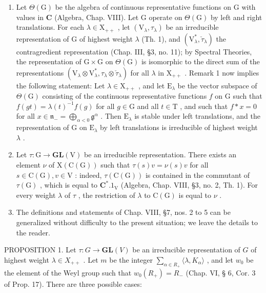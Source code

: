 \begin{enumerate}
\def\labelenumi{\arabic{enumi})}
\setcounter{enumi}{1}
\item
  Let \(\Theta(\mathrm{G})\) be the algebra of continuous representative functions on \(\mathrm{G}\) with values in \(\mathbf{C}\) (Algebra, Chap. VIII). Let \(\mathrm{G}\) operate on \(\Theta(\mathrm{G})\) by left and right translations. For each \(\lambda \in \mathrm{X}_{++}\) , let \((\mathrm{V}_{\lambda}, \tau_{\lambda})\) be an irreducible representation of \(\mathrm{G}\) of highest weight \(\lambda\) (Th. 1), and \((\mathrm{V}_{\lambda}^{*}, \check{\tau}_{\lambda})\) the contragredient representation (Chap. III, §3, no. 11); by Spectral Theories, the representation of \(\mathrm{G} \times \mathrm{G}\) on \(\Theta(\mathrm{G})\) is isomorphic to the direct sum of the representations \((\mathrm{V}_{\lambda} \otimes \mathrm{V}_{\lambda}^{*}, \tau_{\lambda} \otimes \check{\tau}_{\lambda})\) for all \(\lambda\) in \(\mathrm{X}_{++}\) . Remark 1 now implies the following statement: Let \(\lambda \in \mathrm{X}_{++}\) , and let \(\mathrm{E}_{\lambda}\) be the vector subspace of \(\Theta(\mathrm{G})\) consisting of the continuous representative functions \(f\) on \(\mathrm{G}\) such that \(f(gt) = \lambda(t)^{-1} f(g)\) for all \(g \in \mathrm{G}\) and all \(t \in \mathrm{T}\) , and such that \(f * x = 0\) for all \(x \in \mathfrak{n}_{-} = \bigoplus_{\alpha < 0} \mathfrak{g}^{\alpha}\) . Then \(\mathrm{E}_{\lambda}\) is stable under left translations, and the representation of \(\mathrm{G}\) on \(\mathrm{E}_{\lambda}\) by left translations is irreducible of highest weight \(\lambda\) .
\item
  Let \(\tau : \mathrm{G} \to \mathbf{GL}(\mathrm{V})\) be an irreducible representation. There exists an element \(\nu\) of \(\mathrm{X}(\mathrm{C}(\mathrm{G}))\) such that \(\tau(s)v = \nu(s)v\) for all \(s \in \mathrm{C}(\mathrm{G}), v \in \mathrm{V}\) : indeed, \(\tau(\mathrm{C}(\mathrm{G}))\) is contained in the commutant of \(\tau(\mathrm{G})\) , which is equal to \(\mathbf{C}^*.1_{\mathrm{V}}\) (Algebra, Chap. VIII, §3, no. 2, Th. 1). For every weight \(\lambda\) of \(\tau\) , the restriction of \(\lambda\) to \(\mathrm{C}(\mathrm{G})\) is equal to \(\nu\) .
\item
  The definitions and statements of Chap. VIII, §7, nos. 2 to 5 can be generalized without difficulty to the present situation; we leave the details to the reader.
\end{enumerate}

PROPOSITION 1. Let \(\tau : G \to \mathbf{GL}(V)\) be an irreducible representation of \(G\) of highest weight \(\lambda \in X_{++}\) . Let \(m\) be the integer \(\sum_{\alpha \in R_+} \langle \lambda, K_\alpha \rangle\) , and let \(w_0\) be the element of the Weyl group such that \(w_0(R_+) = R_-\) (Chap. VI, § 6, Cor. 3 of Prop. 17). There are three possible cases:

